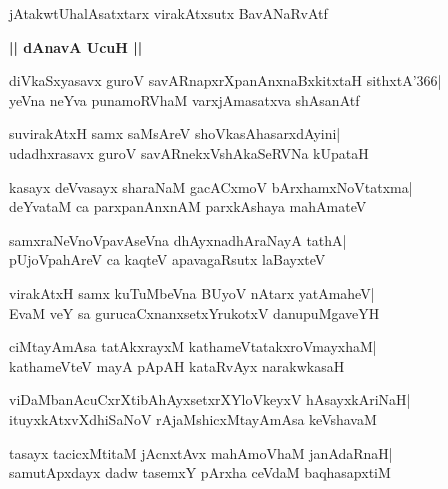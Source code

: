 \documentclass[twoside,12pt,openright]{book}
\newcounter{shloka}[chapter]
\def\uvaca#1{\centerline{{\large\textbf{#1}}}}
\begin{document}
\begin{shloka}%
jAtakwtUhalAsatxtarx virakAtxsutx BavANaRvAtf
\end{shloka}

\uvaca{|| dAnavA UcuH ||}
\begin{shloka}%
diVkaSxyasavx guroV savARnapxrXpanAnxnaBxkitxtaH sithxtA\char'366|\\
yeVna neYva punamoRVhaM varxjAmasatxva shAsanAtf
\end{shloka}

\begin{shloka}%
suvirakAtxH samx saMsAreV shoVkasAhasarxdAyini|\\
udadhxrasavx guroV savARnekxVshAkaSeRVNa kUpataH
\end{shloka}

\begin{shloka}%
kasayx deVvasayx sharaNaM gacACxmoV bArxhamxNoVtatxma|\\
deYvataM ca parxpanAnxnAM parxkAshaya mahAmateV
\end{shloka}

\begin{shloka}%
samxraNeVnoVpavAseVna dhAyxnadhAraNayA tathA|\\
pUjoVpahAreV ca kaqteV apavagaRsutx laBayxteV
\end{shloka}

\begin{shloka}%
virakAtxH samx kuTuMbeVna BUyoV nAtarx yatAmaheV|\\
EvaM veY sa gurucaCxnanxsetxYrukotxV danupuMgaveYH
\end{shloka}

\begin{shloka}%
ciMtayAmAsa tatAkxrayxM kathameVtatakxroVmayxhaM|\\
kathameVteV mayA pApAH kataRvAyx narakwkasaH
\end{shloka}

\begin{shloka}%
viDaMbanAcuCxrXtibAhAyxsetxrXYloVkeyxV hAsayxkAriNaH|\\
ituyxkAtxvXdhiSaNoV rAjaMshicxMtayAmAsa keVshavaM
\end{shloka}

\begin{shloka}%
tasayx tacicxMtitaM jAcnxtAvx mahAmoVhaM janAdaRnaH|\\
samutApxdayx dadw tasemxY pArxha ceVdaM baqhasapxtiM
\end{shloka}
\end{document}
